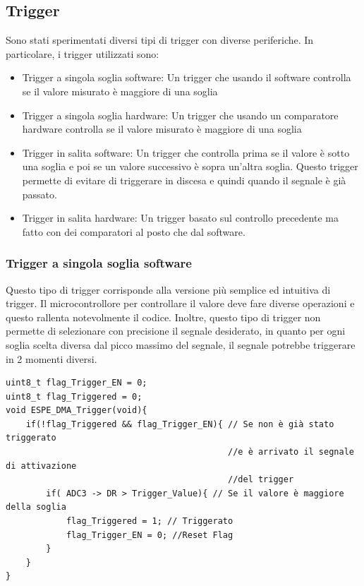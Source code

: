 \subsection{Trigger}
Sono stati sperimentati diversi tipi di trigger con diverse periferiche. In particolare, i trigger utilizzati sono:
\begin{itemize}
    \item Trigger a singola soglia software: Un trigger che usando il software controlla se il valore misurato è maggiore di una soglia
    \item Trigger a singola soglia hardware: Un trigger che usando un comparatore hardware controlla se il valore misurato è maggiore di una soglia
    \item Trigger in salita software: Un trigger che controlla prima se il valore è sotto una soglia e poi se un valore successivo è sopra un'altra soglia. Questo trigger permette di evitare di triggerare in discesa e quindi quando il segnale è già passato.
    \item Trigger in salita hardware: Un trigger basato sul controllo precedente ma fatto con dei comparatori al posto che dal software.
\end{itemize}

\subsubsection{Trigger a singola soglia software}
Questo tipo di trigger corrisponde alla versione più semplice ed intuitiva di trigger. Il microcontrollore per controllare il valore deve fare diverse operazioni e questo rallenta notevolmente il codice. Inoltre, questo tipo di trigger non permette di selezionare con precisione il segnale desiderato, in quanto per ogni soglia scelta diversa dal picco massimo del segnale, il segnale potrebbe triggerare in 2 momenti diversi.

\noindent
\begin{verbatim}
uint8_t flag_Trigger_EN = 0;
uint8_t flag_Triggered = 0;
void ESPE_DMA_Trigger(void){
    if(!flag_Triggered && flag_Trigger_EN){ // Se non è già stato triggerato
                                            //e è arrivato il segnale di attivazione
                                            //del trigger
        if( ADC3 -> DR > Trigger_Value){ // Se il valore è maggiore della soglia
            flag_Triggered = 1; // Triggerato
            flag_Trigger_EN = 0; //Reset Flag
        }
    }
}
\end{verbatim}

